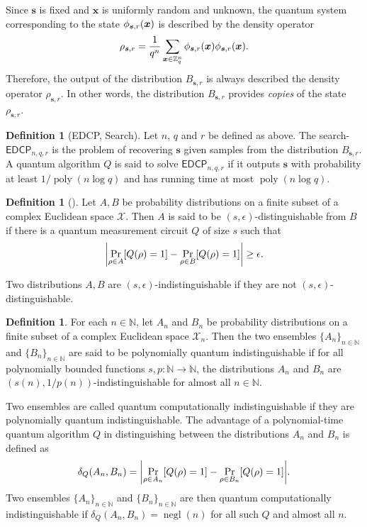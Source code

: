 \documentclass[11pt]{article}
\theoremstyle{plain}
\theoremstyle{definition}
\newtheorem{definition}[theorem]{Definition}
\DeclareMathOperator{\negl}{negl} %
\DeclareMathOperator{\poly}{poly}
\DeclarePairedDelimiter{\abs}{\lvert}{\rvert}
\let\ket\relax
\DeclarePairedDelimiter{\ket}{\lvert}{\rangle}
\let\bra\relax
\DeclarePairedDelimiter{\bra}{\langle}{\rvert}
\def\N{\mathbb{N}}
\def\Z{\mathbb{Z}}
\def\edcp{\mathsf{EDCP}}
\begin{document}
Since $\bm{s}$ is fixed and $\bm{x}$ is uniformly random and unknown, the quantum system corresponding to the state $\ket{\phi_{\bm{s}, r}(\bm{x})}$ is described by the density operator
\[ \rho_{\bm{s}, r} = \frac{1}{q^n} \sum_{\bm{x} \in \Z_q^n} \ket{\phi_{\bm{s}, r}(\bm{x})} \bra{\phi_{\bm{s}, r}(\bm{x})}. \]
Therefore, the output of the distribution $B_{\bm{s}, r}$ is always described the density operator $\rho_{\bm{s}, r}$. In other words, the distribution $B_{\bm{s}, r}$ provides \textit{copies} of the state $\rho_{\bm{s}, r}$.
\begin{definition}[EDCP, Search]
    Let $n$, $q$ and $r$ be defined as above. The search-$\edcp_{n, q, r}$ is the problem of recovering $\bm{s}$ given samples from the distribution $B_{\bm{s}, r}$. A quantum algorithm $Q$ is said to solve $\edcp_{n, q, r}$ if it outputs $\bm{s}$ with probability at least $1 / \poly(n\log q)$ and has running time at most $\poly(n\log q)$.
\end{definition}
\begin{definition}[\cite{watrous2009zero}]
    Let $A, B$ be probability distributions on a finite subset of a complex Euclidean space $\mathcal{X}$. Then $A$ is said to be $(s, \epsilon)$-distinguishable from $B$ if there is a quantum measurement circuit $Q$ of size $s$ such that
    \[ \abs*{ \Pr_{\rho \in A}[Q(\rho) = 1] - \Pr_{\rho \in B}[Q(\rho) = 1] } \ge \epsilon. \]
\end{definition} 
Two distributions $A, B$ are $(s, \epsilon)$-indistinguishable if they are not $(s, \epsilon)$-distinguishable.
\begin{definition}
    For each $n \in \N$, let $A_n$ and $B_n$ be probability distributions on a finite subset of a complex Euclidean space $\mathcal{X}_n$. Then the two ensembles $\{ A_n \}_{n \in \N}$ and $\{ B_n \}_{n \in \N}$ are said to be polynomially quantum indistinguishable if for all polynomially bounded functions $s, p: \N \rightarrow \N$, the distributions $A_n$ and $B_n$ are $(s(n), 1 / p(n))$-indistinguishable for almost all $n \in \N$.
\end{definition}
Two ensembles are called quantum computationally indistinguishable if they are polynomially quantum indistinguishable. The advantage of a polynomial-time quantum algorithm $Q$ in distinguishing between the distributions $A_n$ and $B_n$ is defined as
\[ \delta_Q(A_n, B_n) = \abs*{ \Pr_{\rho \in A_n}[Q(\rho) = 1] - \Pr_{\rho \in B_n}[Q(\rho) = 1] }. \]
Two ensembles $\{ A_n \}_{n \in \N}$ and $\{ B_n \}_{n \in \N}$ are then quantum computationally indistinguishable if $\delta_Q(A_n, B_n) = \negl(n)$ for all such $Q$ and almost all $n$. 
\end{document}
